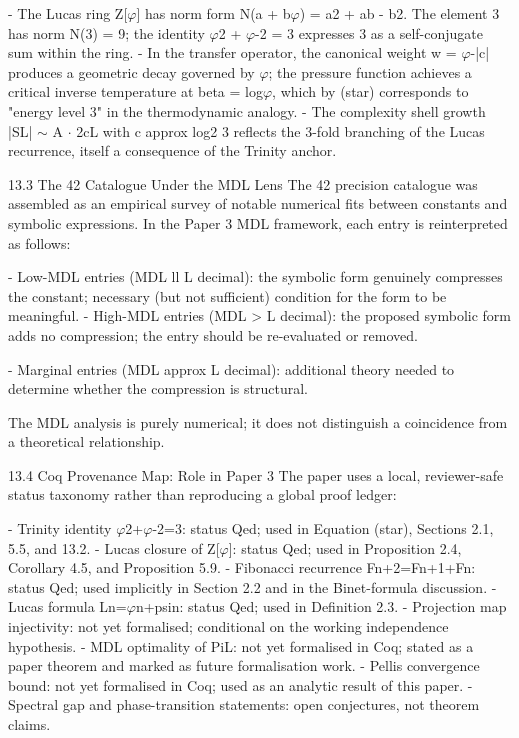   - The Lucas ring Z[$\varphi$] has norm form N(a + b$\varphi$) = a2 + ab - b2. The element 3 has norm
  N(3) = 9; the identity $\varphi$2 + $\varphi$-2 = 3 expresses 3 as a self-conjugate sum within the ring.
  - In the transfer operator, the canonical weight w = $\varphi$-|c| produces a geometric decay
  governed by $\varphi$; the pressure function achieves a critical inverse temperature at beta =
  log$\varphi$, which by (star) corresponds to "energy level 3" in the thermodynamic analogy.
  - The complexity shell growth |SL| $\sim$ A $\cdot$ 2cL with c approx log2 3 reflects the 3-fold
  branching of the Lucas recurrence, itself a consequence of the Trinity anchor.

  13.3 The 42 Catalogue Under the MDL Lens
  The 42 precision catalogue was assembled as an empirical survey of notable numerical
  fits between constants and symbolic expressions. In the Paper 3 MDL framework, each
  entry is reinterpreted as follows:

  - Low-MDL entries (MDL ll L decimal): the symbolic form genuinely compresses the
  constant; necessary (but not sufficient) condition for the form to be meaningful.
  - High-MDL entries (MDL > L decimal): the proposed symbolic form adds no
  compression; the entry should be re-evaluated or removed.

  - Marginal entries (MDL approx L decimal): additional theory needed to determine
  whether the compression is structural.

  The MDL analysis is purely numerical; it does not distinguish a coincidence from a
  theoretical relationship.

  13.4 Coq Provenance Map: Role in Paper 3
  The paper uses a local, reviewer-safe status taxonomy rather than reproducing a global
  proof ledger:

  - Trinity identity $\varphi$2+$\varphi$-2=3: status Qed; used in Equation (star), Sections 2.1, 5.5, and
  13.2.
  - Lucas closure of Z[$\varphi$]: status Qed; used in Proposition 2.4, Corollary 4.5, and
  Proposition 5.9.
  - Fibonacci recurrence Fn+2=Fn+1+Fn: status Qed; used implicitly in Section 2.2 and
  in the Binet-formula discussion.
  - Lucas formula Ln=$\varphi$n+psin: status Qed; used in Definition 2.3.
  - Projection map injectivity:     not   yet   formalised;   conditional   on   the   working
  independence hypothesis.
  - MDL optimality of PiL: not yet formalised in Coq; stated as a paper theorem and
  marked as future formalisation work.
  - Pellis convergence bound: not yet formalised in Coq; used as an analytic result of this
  paper.
  - Spectral gap and phase-transition statements: open conjectures, not theorem claims.

